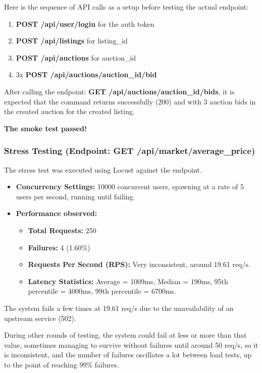 \documentclass[11pt,a4paper]{article}
\begin{document}
Here is the sequence of API calls as a setup before testing the actual endpoint:
\begin{enumerate}
    \item \textbf{POST /api/user/login} for the auth token
    \item \textbf{POST /api/listings} for listing\_id
    \item \textbf{POST /api/auctions} for auction\_id
    \item 3x \textbf{POST /api/auctions/{auction\_id}/bid}
\end{enumerate}

After calling the endpoint: \textbf{GET /api/auctions/{auction\_id}/bids}, it is expected that the command returns successfully ($200$) and with $3$ auction bids in the created auction for the created listing.

\textbf{The smoke test passed!}

\subsubsection*{Stress Testing (Endpoint: GET /api/market/average\_price)}
The stress test was executed using Locust against the endpoint.
\begin{itemize}
    \item \textbf{Concurrency Settings:} 10000 concurrent users, spawning at a rate of 5 users per second, running until failing.
    \item \textbf{Performance observed:}
    \begin{itemize}
        \item \textbf{Total Requests:} 250
        \item \textbf{Failures:} 4 (1.60\%)
        \item \textbf{Requests Per Second (RPS):} Very inconsistent, around 19.61 req/s.
        \item \textbf{Latency Statistics:} Average = 1009ms, Median = 190ms, 95th percentile = 4000ms, 99th percentile = 6700ms.
    \end{itemize}
\end{itemize}
The system fails a few times at 19.61 req/s due to the unavailability of an upstream service (502).

During other rounds of testing, the system could fail at less or more than that value, sometimes managing to survive without failures until around 50 req/s, so it is inconsistent, and the number of failures oscillates a lot between load tests, up to the point of reaching 99\% failures.
\end{document}
